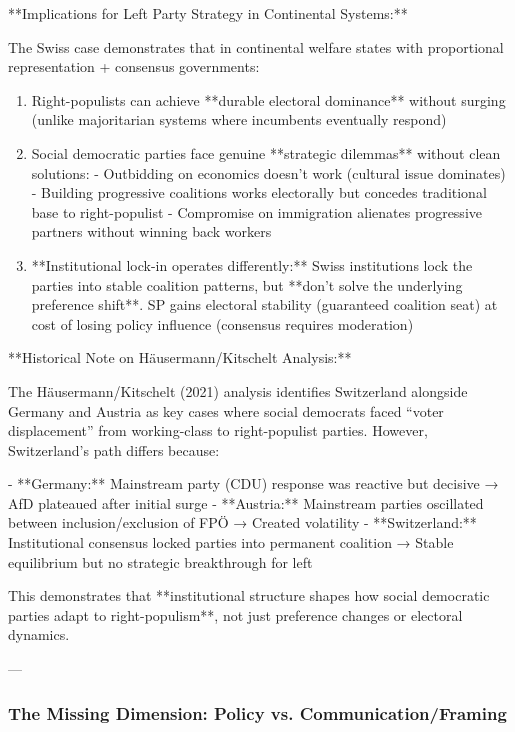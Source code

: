 **Implications for Left Party Strategy in Continental Systems:**

The Swiss case demonstrates that in continental welfare states with proportional representation + consensus governments:

\begin{enumerate}

\item Right-populists can achieve **durable electoral dominance** without surging (unlike majoritarian systems where incumbents eventually respond)

\item Social democratic parties face genuine **strategic dilemmas** without clean solutions:
   - Outbidding on economics doesn't work (cultural issue dominates)
   - Building progressive coalitions works electorally but concedes traditional base to right-populist
   - Compromise on immigration alienates progressive partners without winning back workers

\item **Institutional lock-in operates differently:** Swiss institutions lock the parties into stable coalition patterns, but **don't solve the underlying preference shift**. SP gains electoral stability (guaranteed coalition seat) at cost of losing policy influence (consensus requires moderation)

\end{enumerate}

**Historical Note on Häusermann/Kitschelt Analysis:**

The Häusermann/Kitschelt (2021) analysis identifies Switzerland alongside Germany and Austria as key cases where social democrats faced ``voter displacement'' from working-class to right-populist parties. However, Switzerland's path differs because:

- **Germany:** Mainstream party (CDU) response was reactive but decisive → AfD plateaued after initial surge
- **Austria:** Mainstream parties oscillated between inclusion/exclusion of FPÖ → Created volatility
- **Switzerland:** Institutional consensus locked parties into permanent coalition → Stable equilibrium but no strategic breakthrough for left

This demonstrates that **institutional structure shapes how social democratic parties adapt to right-populism**, not just preference changes or electoral dynamics.

---

\subsubsection{The Missing Dimension: Policy vs. Communication/Framing}

